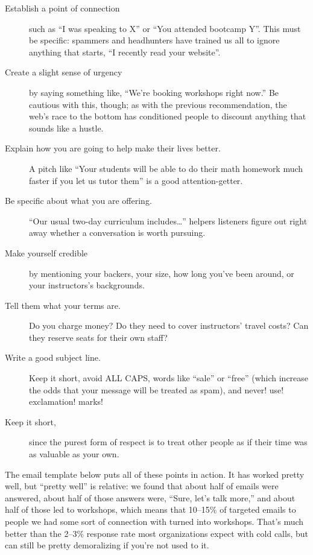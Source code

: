 \begin{description}

\item[Establish a point of connection] such as ``I was speaking to X''
  or ``You attended bootcamp Y''. This must be specific: spammers and
  headhunters have trained us all to ignore anything that starts, ``I
  recently read your website''.

\item[Create a slight sense of urgency] by saying something like,
  ``We're booking workshops right now.''  Be cautious with this,
  though; as with the previous recommendation, the web's race to the
  bottom has conditioned people to discount anything that sounds like
  a hustle.

\item[Explain how you are going to help make their lives better.]  A
  pitch like ``Your students will be able to do their math homework
  much faster if you let us tutor them'' is a good attention-getter.

\item[Be specific about what you are offering.] ``Our usual two-day
  curriculum includes{\ldots}'' helpers listeners figure out right
  away whether a conversation is worth pursuing.

\item[Make yourself credible] by mentioning your backers, your size,
  how long you've been around, or your instructors's backgrounds.

\item[Tell them what your terms are.]  Do you charge money? Do they
  need to cover instructors' travel costs?  Can they reserve seats for
  their own staff?

\item[Write a good subject line.]  Keep it short, avoid ALL CAPS,
  words like ``sale'' or ``free'' (which increase the odds that your
  message will be treated as spam), and never! use! exclamation!
  marks!

\item[Keep it short,] since the purest form of respect is to treat
  other people as if their time was as valuable as your own.

\end{description}

The email template below puts all of these points in action.  It has
worked pretty well, but ``pretty well'' is relative: we found that
about half of emails were answered, about half of those answers were,
``Sure, let's talk more,'' and about half of those led to workshops,
which means that 10--15\% of targeted emails to people we had some
sort of connection with turned into workshops.  That's much better
than the 2--3\% response rate most organizations expect with cold
calls, but can still be pretty demoralizing if you're not used to it.

